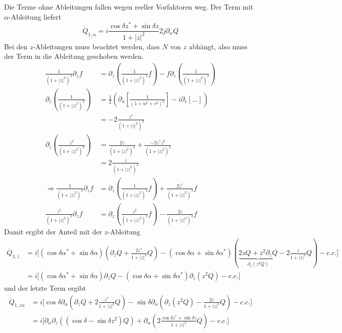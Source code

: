 Die Terme ohne Ableitungen fallen wegen reeller Vorfaktoren weg. Der Term mit $\alpha$-Ableitung liefert
\begin{equation*}
  \dot Q_{1,\alpha} = i \frac{\cos\delta z^* + \sin \delta z}{1+|z|^2} 2j\partial_\alpha Q
\end{equation*}
Bei den $z$-Ableitungen muss beachtet werden, dass $N$ von $z$ abhängt, also muss der Term in die Ableitung geschoben werden.
\begin{align*}
  \frac{1}{(1+|z|^2)^2} \partial _z f &= \partial_z \left(\frac{1}{(1+|z|^2)^2} f\right) - f \partial_z\left(\frac{1}{(1+|z|^2)^2}\right)\\
  \partial_z \left(\frac{1}{(1+|z|^2)^2}\right)&= \frac12 \left( \partial_u [\frac{1}{(1+u^2 + v^2)^2}] - i \partial_v [...]\right)\\
  &= -2\frac{z^*}{(1+|z|^2)^3}\\
\partial_z \left(\frac{z^2}{(1+|z|^2)^2}\right)&= \frac{2z}{(1+|z|^2)^2} + \frac{-2 z^* z^2 }{(1+|z|^2)^3}\\
  &= 2\frac{z}{(1+|z|^2)^3}\\
  \Rightarrow \frac{1}{(1+|z|^2)^2}\partial_z f &= \partial_z \left(\frac{1}{(1+|z|^2)^2} f\right) + \frac{2z^*}{(1+|z|^2)^3} f\\  
  \frac{z^2}{(1+|z|^2)^2}\partial_z f &= \partial_z \left(\frac{z^2}{(1+|z|^2)^2} f\right) - \frac{2z}{(1+|z|^2)^3} f
\end{align*}
Damit ergibt der Anteil mit der $z$-Ableitung
\begin{align*}
  \dot Q_{1,z} &= i \Bigg[ (\cos\delta \alpha^* + \sin\delta \alpha) \left( \partial_z Q + \frac{2z^*}{1+|z|^2} Q \right) -(\cos\delta \alpha + \sin\delta \alpha^* )\left(\underbrace{2zQ + z^2\partial_z Q}_{\partial_z(z^2Q)} - 2 \frac{z}{1+|z|^2} Q\right) - c.c.\Bigg]\\
  &= i \Big[ (\cos\delta\alpha^* + \sin\delta \alpha) \partial_z Q  - (\cos\delta \alpha +\sin\delta\alpha^*)\partial_z(z^2Q) - c.c.\Big]
\end{align*}
und der letzte Term ergibt
\begin{align*}
  \dot Q_{1,z\alpha} &= i \Big[ \cos\delta \partial_\alpha\left( \partial_z Q + 2 \frac{z^*}{1+|z|^2}Q\right)  - \sin\delta \partial_\alpha\left(\partial_z(z^2Q) - \frac{2z}{1+|z|^2} Q\right) - c.c. \Big]\\
  &= i \Bigg[ \partial_\alpha \partial_z \left( (\cos \delta - \sin\delta z^2)Q\right) + \partial_\alpha \left(2\frac{\cos\delta z^* + \sin\delta z}{1+|z|^2} Q\right) - c.c. \Bigg]
\end{align*}
